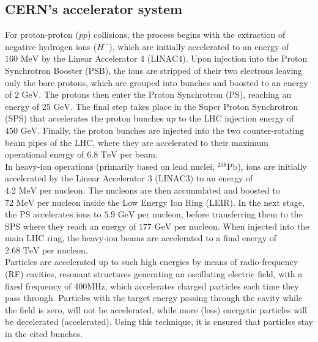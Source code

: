 
\subsection{CERN's accelerator system}\label{sec:LHCAtlas/LHC/CAS}

For proton-proton ($pp$) collisions, the process begins with the extraction of negative hydrogen ions ($H^-$), which are initially accelerated to an energy of $160\text{ MeV}$ by the Linear Accelerator 4 ($\text{LINAC4}$). 
Upon injection into the Proton Synchrotron Booster (PSB), the ions are stripped of their two electrons leaving only the bare protons, which are grouped into bunches and boosted to an energy of $2\text{ GeV}$. 
The protons then enter the Proton Synchrotron (PS), reaching an energy of $25\text{ GeV}$. 
The final step takes place in the Super Proton Synchrotron (SPS) that accelerates the proton bunches up to the LHC injection energy of $450\text{ GeV}$. 
Finally, the proton bunches are injected into the two counter-rotating beam pipes of the LHC, where they are accelerated to their maximum operational energy of $6.8\text{ TeV}$ per beam.\\
In heavy-ion operations (primarily based on lead nuclei, $^{208}\text{Pb}$), ions are initially accelerated by the Linear Accelerator 3 ($\text{LINAC3}$) to an energy of $4.2\text{ MeV per nucleon}$.
The nucleons are then accumulated and boosted to $72\text{ MeV per nucleon}$ inside the Low Energy Ion Ring (LEIR).
In the next stage, the PS accelerates ions to $5.9\text{ GeV per nucleon}$, before transferring them to the SPS where they reach an energy of $177\text{ GeV per nucleon}$. 
When injected into the main LHC ring, the heavy-ion beams are accelerated to a final energy of $2.68\text{ TeV per nucleon}$.\\
Particles are accelerated up to such high energies by means of radio-frequency (RF) cavities, resonant structures generating an oscillating electric field, with a fixed frequency of 400MHz, which accelerates charged particles each time they pass through. 
Particles with the target energy passing through the cavity while the field is zero, will not be accelerated, while more (less) energetic particles will be decelerated (accelerated). 
Using this technique, it is ensured that particles stay in the cited bunches.



